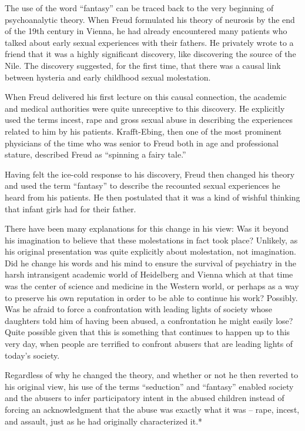\documentclass[]{book}
\begin{document}
The use of the word ``fantasy'' can be traced back to the very beginning of psychoanalytic theory. When Freud formulated his theory of neurosis by the end of the 19th century in Vienna, he had already encountered many patients who talked about early sexual experiences with their fathers. He privately wrote to a friend that it was a highly significant discovery, like discovering the source of the Nile. The discovery suggested, for the first time, that there was a causal link between hysteria and early childhood sexual molestation.

When Freud delivered his first lecture on this causal connection, the academic and medical authorities were quite unreceptive to this discovery. He explicitly used the terms incest, rape and gross sexual abuse in describing the experiences related to him by his patients. Krafft-Ebing, then one of the most prominent physicians of the time who was senior to Freud both in age and professional stature, described Freud as ``spinning a fairy tale.''

Having felt the ice-cold response to his discovery, Freud then changed his theory and used the term ``fantasy'' to describe the recounted sexual experiences he heard from his patients. He then postulated that it was a kind of wishful thinking that infant girls had for their father.

There have been many explanations for this change in his view: Was it beyond his imagination to believe that these molestations in fact took place? Unlikely, as his original presentation was quite explicitly about molestation, not imagination. Did he change his words and his mind to ensure the survival of psychiatry in the harsh intransigent academic world of Heidelberg and Vienna which at that time was the center of science and medicine in the Western world, or perhaps as a way to preserve his own reputation in order to be able to continue his work? Possibly. Was he afraid to force a confrontation with leading lights of society whose daughters told him of having been abused, a confrontation he might easily lose? Quite possible given that this is something that continues to happen up to this very day, when people are terrified to confront abusers that are leading lights of today's society.

Regardless of why he changed the theory, and whether or not he then reverted to his original view, his use of the terms ``seduction'' and ``fantasy'' enabled society and the abusers to infer participatory intent in the abused children instead of forcing an acknowledgment that the abuse was exactly what it was -- rape, incest, and assault, just as he had originally characterized it.*
\end{document}
